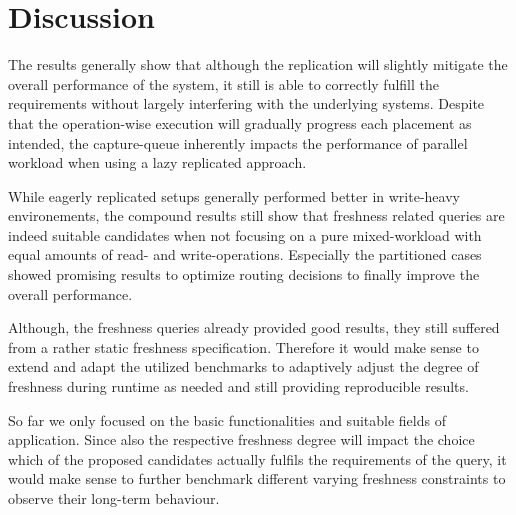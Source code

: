




\section{Discussion}
\label{sec:discussion}

The results generally show that although the replication will slightly mitigate the overall performance of the system, it still is able to correctly fulfill the 
requirements without largely interfering with the underlying systems. 
Despite that the operation-wise execution will gradually progress each placement as intended, the capture-queue inherently impacts the performance of parallel workload
when using a lazy replicated approach.

While eagerly replicated setups generally performed better in write-heavy environements, 
the compound results still show that freshness related queries are indeed suitable candidates when not focusing on a pure mixed-workload with equal amounts of 
read- and write-operations. 
Especially the partitioned cases showed promising results to optimize routing decisions to finally improve the overall performance.


Although, the freshness queries already provided good results, they still suffered from a rather static freshness specification. 
Therefore it would make sense to extend and adapt the utilized benchmarks to adaptively adjust the degree of freshness during runtime
as needed and still providing reproducible results.

So far we only focused on the basic functionalities and suitable fields of application.
Since also the respective freshness degree will impact the choice which of the proposed candidates actually fulfils the requirements of the query,
it would make sense to further benchmark different varying freshness constraints to observe their long-term behaviour. 






